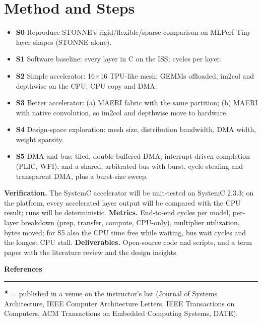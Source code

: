 \documentclass[10pt,a4paper]{article}
\newcommand{\vstar}{$^\bigstar$}
\begin{document}
\section{Method and Steps}
\begin{itemize}
\item \textbf{S0} Reproduce STONNE's rigid/flexible/sparse comparison on MLPerf Tiny layer shapes (STONNE alone).
\item \textbf{S1} Software baseline: every layer in C on the ISS; cycles per layer.
\item \textbf{S2} Simple accelerator: 16$\times$16 TPU-like mesh; GEMMs offloaded, im2col and depthwise on the CPU; CPU copy and DMA.
\item \textbf{S3} Better accelerator: (a) MAERI fabric with the same partition; (b) MAERI with native convolution, so im2col and depthwise move to hardware.
\item \textbf{S4} Design-space exploration: mesh size, distribution bandwidth, DMA width, weight sparsity.
\item \textbf{S5} DMA and bus: tiled, double-buffered DMA; interrupt-driven completion (PLIC, WFI); and a shared, arbitrated bus with burst, cycle-stealing and transparent DMA, plus a burst-size sweep.
\end{itemize}
\textbf{Verification.} The SystemC accelerator will be unit-tested on SystemC 2.3.3; on the platform, every accelerated layer output will be compared with the CPU result; runs will be deterministic. \textbf{Metrics.} End-to-end cycles per model, per-layer breakdown (prep, transfer, compute, CPU-only), multiplier utilization, bytes moved; for S5 also the CPU time free while waiting, bus wait cycles and the longest CPU stall. \textbf{Deliverables.} Open-source code and scripts, and a term paper with the literature review and the design insights.

\newpage
{\large\bfseries\color{acc} References}\\[-1ex]
\textcolor{gray!50}{\rule{\linewidth}{0.4pt}}

\vstar{} = published in a venue on the instructor's list (Journal of Systems Architecture, IEEE Computer Architecture Letters, IEEE Transactions on Computers, ACM Transactions on Embedded Computing Systems, DATE).
\end{document}
